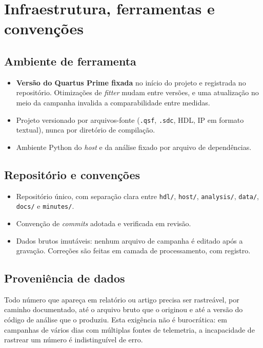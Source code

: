 \documentclass[11pt,a4paper]{article}
\begin{document}
\section{Infraestrutura, ferramentas e convenções}

\subsection{Ambiente de ferramenta}

\begin{itemize}
  \item \textbf{Versão do Quartus Prime fixada} no início do projeto e registrada no
        repositório. Otimizações de \emph{fitter} mudam entre versões, e uma
        atualização no meio da campanha invalida a comparabilidade entre medidas.
  \item Projeto versionado por arquivos-fonte (\texttt{.qsf}, \texttt{.sdc}, HDL, IP
        em formato textual), nunca por diretório de compilação.
  \item Ambiente Python do \emph{host} e da análise fixado por arquivo de dependências.
\end{itemize}

\subsection{Repositório e convenções}
\label{sec:convencoes}

\begin{itemize}
  \item Repositório único, com separação clara entre \texttt{hdl/}, \texttt{host/},
        \texttt{analysis/}, \texttt{data/}, \texttt{docs/} e \texttt{minutes/}.
  \item Convenção de \emph{commits} adotada e verificada em revisão.
  \item Dados brutos imutáveis: nenhum arquivo de campanha é editado após a gravação.
        Correções são feitas em camada de processamento, com registro.
\end{itemize}

\subsection{Proveniência de dados}

Todo número que apareça em relatório ou artigo precisa ser rastreável, por caminho
documentado, até o arquivo bruto que o originou e até a versão do código de análise
que o produziu. Esta exigência não é burocrática: em campanhas de vários dias com
múltiplas fontes de telemetria, a incapacidade de rastrear um número é indistinguível
de erro.
\end{document}

